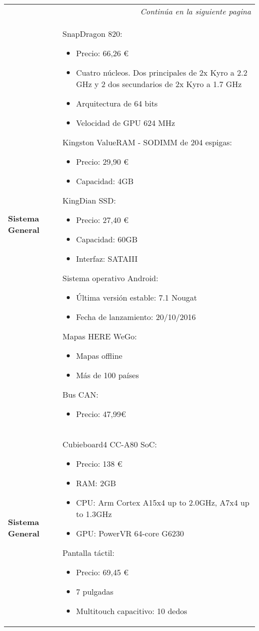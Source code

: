 \begin{center}
\begin{longtable}{p{5cm} p{8cm}}

\hline
\endfirsthead
\hline
\endhead

\hline \multicolumn{2}{r}{\textit{Continúa en la siguiente pagina}} \\
\endfoot
\endlastfoot

\textbf{Sistema General} &
SnapDragon 820:
\begin{itemize}
    \item Precio: 66,26 \euro
    \item Cuatro núcleos. Dos principales de 2x Kyro a 2.2 GHz y 2 dos secundarios de 2x Kyro a 1.7 GHz
    \item Arquitectura de 64 bits
    \item Velocidad de GPU 624 MHz
\end{itemize}
Kingston ValueRAM - SODIMM de 204 espigas:
\begin{itemize}
    \item Precio: 29,90 \euro
    \item Capacidad: 4GB
\end{itemize}
KingDian SSD:
\begin{itemize}
    \item Precio: 27,40 \euro
    \item Capacidad: 60GB
    \item Interfaz: SATAIII
\end{itemize}
Sistema operativo Android:
\begin{itemize}
    \item Última versión estable: 7.1 Nougat
    \item Fecha de lanzamiento: 20/10/2016
\end{itemize}
Mapas HERE WeGo:
\begin{itemize}
    \item Mapas offline
    \item Más de 100 países
\end{itemize}
Bus CAN:
\begin{itemize}
    \item Precio: 47,99\euro
\end{itemize}
\\
\textbf{Sistema General} &
Cubieboard4 CC-A80 SoC:
\begin{itemize}
    \item Precio: 138 \euro
    \item RAM: 2GB
    \item CPU:  Arm Cortex A15x4 up to 2.0GHz, A7x4 up to 1.3GHz
    \item GPU:  PowerVR 64-core G6230
\end{itemize}
Pantalla táctil:
\begin{itemize}
    \item Precio: 69,45 \euro
    \item 7 pulgadas
    \item Multitouch capacitivo: 10 dedos
\end{itemize}
\\ \hline


\end{longtable}
\end{center}
